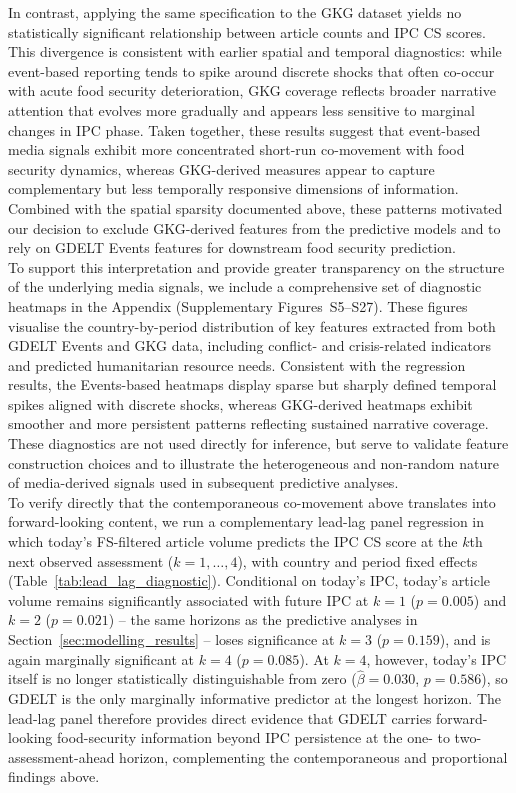 \documentclass{article}
\begin{document}
In contrast, applying the same specification to the GKG dataset yields no statistically significant relationship between article counts and IPC CS scores. This divergence is consistent with earlier spatial and temporal diagnostics: while event-based reporting tends to spike around discrete shocks that often co-occur with acute food security deterioration, GKG coverage reflects broader narrative attention that evolves more gradually and appears less sensitive to marginal changes in IPC phase. Taken together, these results suggest that event-based media signals exhibit more concentrated short-run co-movement with food security dynamics, whereas GKG-derived measures appear to capture complementary but less temporally responsive dimensions of information. Combined with the spatial sparsity documented above, these patterns motivated our decision to exclude GKG-derived features from the predictive models and to rely on GDELT Events features for downstream food security prediction. \\

To support this interpretation and provide greater transparency on the structure of the underlying media signals, we include a comprehensive set of diagnostic heatmaps in the Appendix (Supplementary Figures~S5--S27). These figures visualise the country-by-period distribution of key features extracted from both GDELT Events and GKG data, including conflict- and crisis-related indicators and predicted humanitarian resource needs. Consistent with the regression results, the Events-based heatmaps display sparse but sharply defined temporal spikes aligned with discrete shocks, whereas GKG-derived heatmaps exhibit smoother and more persistent patterns reflecting sustained narrative coverage. These diagnostics are not used directly for inference, but serve to validate feature construction choices and to illustrate the heterogeneous and non-random nature of media-derived signals used in subsequent predictive analyses. \\

To verify directly that the contemporaneous co-movement above translates into forward-looking content, we run a complementary lead-lag panel regression in which today's FS-filtered article volume predicts the IPC CS score at the $k$th next observed assessment ($k=1,\dots,4$), with country and period fixed effects (Table~\ref{tab:lead_lag_diagnostic}). Conditional on today's IPC, today's article volume remains significantly associated with future IPC at $k=1$ ($p=0.005$) and $k=2$ ($p=0.021$) -- the same horizons as the predictive analyses in Section~\ref{sec:modelling_results} -- loses significance at $k=3$ ($p=0.159$), and is again marginally significant at $k=4$ ($p=0.085$). At $k=4$, however, today's IPC itself is no longer statistically distinguishable from zero ($\hat\beta=0.030$, $p=0.586$), so GDELT is the only marginally informative predictor at the longest horizon. The lead-lag panel therefore provides direct evidence that GDELT carries forward-looking food-security information beyond IPC persistence at the one- to two-assessment-ahead horizon, complementing the contemporaneous and proportional findings above. \\
\end{document}

